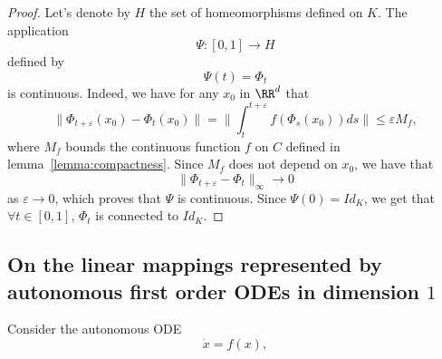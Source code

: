 \documentclass{article}
\begin{document}
\begin{proof}
Let's denote by $H$ the set of homeomorphisms defined on $K$. The application 
$$
\Psi : [0,1] \xrightarrow{} H 
$$
defined by
$$
\Psi(t) = \Phi_t
$$
is continuous. Indeed, we have for any $x_0$ in $\RR^d$ that 
$$
\|\Phi_{t+\varepsilon}(x_0) - \Phi_{t}(x_0)\| = \|\int_{t}^{t+\varepsilon}f(\Phi_{s}(x_0))ds \| \leq \varepsilon M_f,
$$
where $M_f$ bounds the continuous function $f$ on $C$ defined in lemma~\ref{lemma:compactness}.
Since $M_f$ does not depend on $x_0$, we have that 
$$
\|\Phi_{t+\varepsilon} - \Phi_{t}\|_{\infty} \xrightarrow{} 0
$$
as $\varepsilon \xrightarrow{} 0$, which proves that $\Psi$ is continuous.
Since $\Psi(0) = Id_K$, we get that $\forall t \in [0,1]$, $\Phi_t$ is connected to $Id_K$.
\end{proof}



\subsection{On the linear mappings represented by autonomous first order ODEs in dimension $1$}

Consider the autonomous ODE
\begin{equation}\label{eq:autonomous}
    \dot{x} = f(x),
\end{equation}
\end{document}
